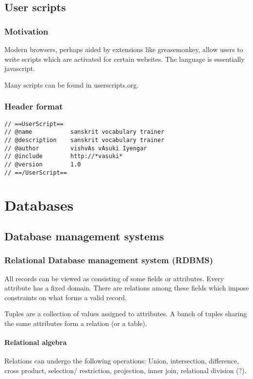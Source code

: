 \chapter{User scripts}
\section{Motivation}
Modern browsers, perhaps aided by extensions like greasemonkey, allow users to write scripts which are activated for certain websites. The language is essentially javascript.

Many scripts can be found in userscripts.org.

\section{Header format}
\begin{verbatim}
// ==UserScript==
// @name           sanskrit vocabulary trainer
// @description    sanskrit vocabulary trainer
// @author         vishvAs vAsuki Iyengar
// @include        http://*vasuki*
// @version        1.0
// ==/UserScript==
\end{verbatim}



\part{Databases}
\chapter{Database management systems}
\section{Relational Database management system (RDBMS)}
All records can be viewed as consisting of some fields or attributes.  Every attribute has a fixed domain. There are relations among these fields which impose constraints on what forms a valid record.

Tuples are a collection of values assigned to attributes. A bunch of tuples sharing the same attributes form a relation (or a table).

\subsection{Relational algebra}
Relations can undergo the following operations: Union, intersection, difference, cross product, selection/ restriction, projection, inner join, relational division (?).

